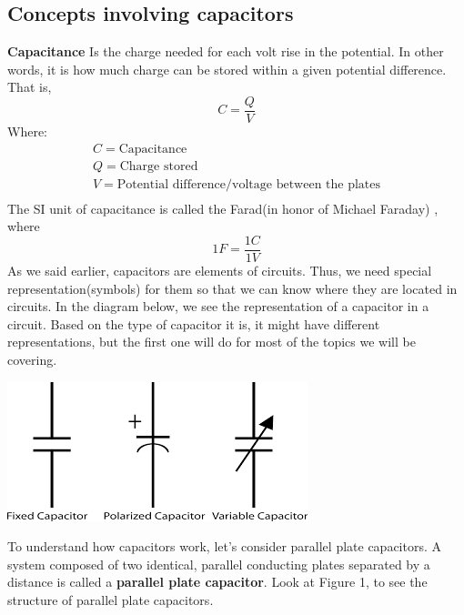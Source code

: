 \documentclass[9pt,addpoints]{exam}
\begin{document}
	\subsection*{Concepts involving capacitors}
		\textbf{Capacitance} \newline
		Is the charge needed for each volt rise in the potential. In other words, it is how much charge can be stored within a given potential difference. That is,
		$$	C = \frac{Q}{V} $$
		Where:
		\begin{equation*}
			\begin{split}
				C = \text{Capacitance} \\
				Q = \text{Charge stored} \\
				V = \text{Potential difference/voltage between the plates}\\
			\end{split}
		\end{equation*}
		The SI unit of capacitance is called the Farad(in honor of Michael Faraday)
		, where 
		\begin{equation}
			1 F = \frac{1C}{1V}
		\end{equation}
	As we said earlier, capacitors are elements of circuits. Thus, we need special representation(symbols) for them so that we can know where they are located in circuits. In the diagram below, we see the representation of a capacitor in a circuit. Based on the type of capacitor it is, it might have different representations, but the first one will do for most of the topics we will be covering. 
	\begin{center}
		\includegraphics[scale=0.7]{cap.png}
		\label{fig:cap}
	\end{center}
    To understand how capacitors work, let's consider parallel plate capacitors. A system composed of two identical, parallel conducting plates separated by a distance is called a \textbf{parallel plate capacitor}. Look at Figure 1, to see the structure of parallel plate capacitors.
\end{document}
